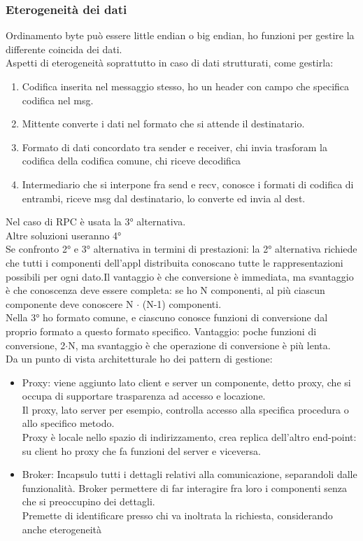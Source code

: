 \documentclass[16px]{article}
\begin{document}
\subsubsection{Eterogeneità dei dati}
Ordinamento byte può essere little endian o big endian, ho funzioni per gestire la differente coincida dei dati.\\ Aspetti di eterogeneità soprattutto in caso di dati strutturati, come gestirla:
\begin{enumerate}
\item Codifica inserita nel messaggio stesso, ho un header con campo che specifica codifica nel msg.
\item Mittente converte i dati nel formato che si attende il destinatario.
\item Formato di dati concordato tra sender e receiver, chi invia trasforam la codifica della codifica comune, chi riceve decodifica
\item Intermediario che si interpone fra send e recv, conosce i formati di codifica di entrambi, riceve msg dal destinatario, lo converte ed invia al dest.
\end{enumerate}
Nel caso di RPC è usata la 3° alternativa.\\ Altre soluzioni useranno 4°\\ Se confronto 2° e 3° alternativa in termini di prestazioni: la 2° alternativa richiede che tutti i componenti dell'appl distribuita conoscano tutte le rappresentazioni possibili per ogni dato.Il vantaggio è che conversione è immediata, ma svantaggio è che conoscenza deve essere completa: se ho N componenti, al più ciascun componente deve conoscere N $\cdot$ (N-1) componenti.\\Nella 3° ho formato comune, e ciascuno conosce funzioni di conversione dal proprio formato a questo formato specifico. Vantaggio: poche funzioni di conversione, 2$\cdot$N, ma svantaggio è che operazione di conversione è più lenta.\\ Da un punto di vista architetturale ho dei pattern di gestione:
\begin{itemize}
\item Proxy: viene aggiunto lato client e server un componente, detto proxy, che si occupa di supportare trasparenza ad accesso e locazione.\\ Il proxy, lato server per esempio, controlla accesso alla specifica procedura o allo specifico metodo.\\ Proxy è locale nello spazio di indirizzamento, crea replica dell'altro end-point: su client ho proxy che fa funzioni del server e viceversa.
\item Broker: Incapsulo tutti i dettagli relativi alla comunicazione, separandoli dalle funzionalità. Broker permettere di far interagire fra loro i componenti senza che si preoccupino dei dettagli. \\ Premette di identificare presso chi va inoltrata la richiesta, considerando anche eterogeneità
\end{itemize}
\end{document}

